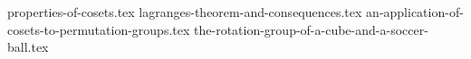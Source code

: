 \setcounter{chapter}{7}
\setcounter{section}{0}
{properties-of-cosets.tex}
{lagranges-theorem-and-consequences.tex}
{an-application-of-cosets-to-permutation-groups.tex}
{the-rotation-group-of-a-cube-and-a-soccer-ball.tex}
